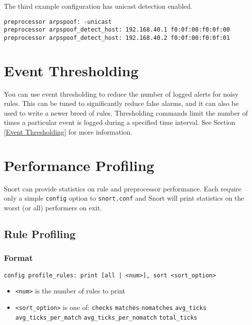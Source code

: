 \documentclass[english]{report}
\begin{document}
The third example configuration has unicast detection enabled.
\begin{verbatim}
preprocessor arpspoof: -unicast
preprocessor arpspoof_detect_host: 192.168.40.1 f0:0f:00:f0:0f:00
preprocessor arpspoof_detect_host: 192.168.40.2 f0:0f:00:f0:0f:01

\end{verbatim}
\section{Event Thresholding}
You can use event thresholding to reduce the number of logged alerts for noisy
rules.  This can be tuned to significantly reduce false alarms, and it can also
be used to write a newer breed of rules. Thresholding commands limit the number
of times a particular event is logged during a specified time interval. See Section \ref{Event Thresholding} for more information.

\section{Performance Profiling}

Snort can provide statistics on rule and preprocessor performance.  Each require only a
simple \texttt{config} option to \texttt{snort.conf} and Snort will print statistics on the worst (or all) performers
on exit.

\subsection{Rule Profiling\label{rule profiling}}

\subsubsection{Format}
\texttt{config profile\_rules: print [all | <num>], sort <sort\_option>}
\begin{itemize}
\item \texttt{<num>} is the number of rules to print
\item \texttt{<sort\_option>} is one of:
    \subitem \texttt{checks}
    \subitem \texttt{matches}
    \subitem \texttt{nomatches}
    \subitem \texttt{avg\_ticks}
    \subitem \texttt{avg\_ticks\_per\_match}
    \subitem \texttt{avg\_ticks\_per\_nomatch}
    \subitem \texttt{total\_ticks}
\end{itemize}
\end{document}
